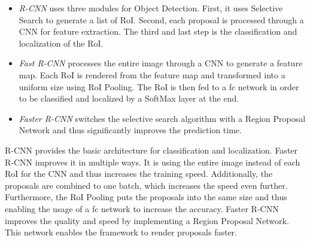 

\begin{itemize}
    \item \textit{R-CNN} \cite{Girshick.11Nov13} uses three modules for Object Detection. First, it uses Selective Search to generate a list of \ac{RoI}. Second, each proposal is processed through a \ac{CNN} for feature extraction. The third and last step is the classification and localization of the \ac{RoI}.
    
    \item \textit{Fast R-CNN} \cite{Girshick.30Apr15} processes the entire image through a \ac{CNN} to generate a feature map. Each \ac{RoI} is rendered from the feature map and transformed into a uniform size using RoI Pooling. The \ac{RoI} is then fed to a \acl{fc} network in order to be classified and localized by a SoftMax layer at the end.
    
    \item \textit{Faster R-CNN} \cite{Ren.04Jun15} switches the selective search algorithm with a Region Proposal Network and thus significantly improves the prediction time. 
    
\end{itemize}

R-CNN \cite{Girshick.11Nov13} provides the basic architecture for classification and localization. Faster R-CNN \cite{Girshick.30Apr15} improves it in multiple ways. It is using the entire image instead of each \ac{RoI} for the \acl{CNN} and thus increases the training speed. Additionally, the proposals are combined to one batch, which increases the speed even further. Furthermore, the \ac{RoI} Pooling puts the proposals into the same size and thus enabling the usage of a \acl{fc} network to increase the accuracy. Faster R-CNN \cite{Ren.04Jun15} improves the quality and speed by implementing a Region Proposal Network. This network enables the framework to render proposals faster.